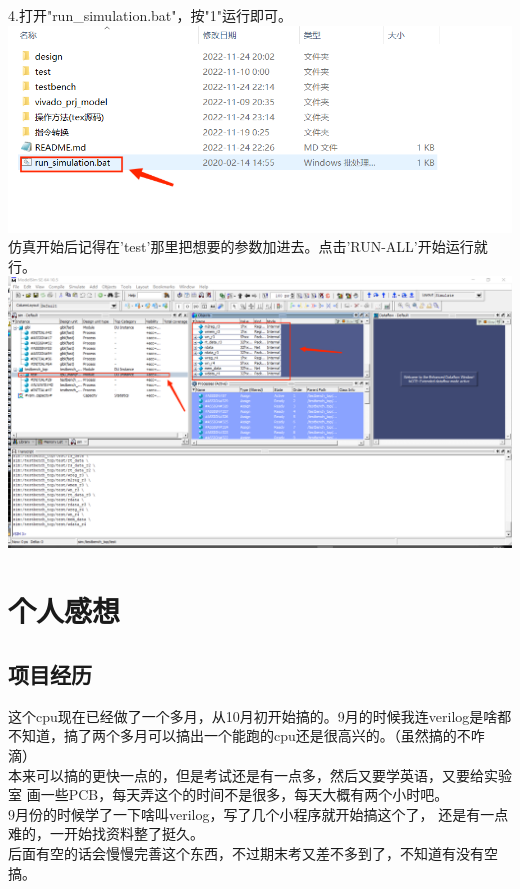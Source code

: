 \documentclass{article}
\newcommand{\tab}{\makebox[2em][l]{}}   %
\begin{document}
\begin{flushleft}
   \tab 4.打开"run\_simulation.bat"，按"1"运行即可。\\
   \mbox{} \hfill{\includegraphics[scale=0.4]{9.png}}\hfill \mbox{}\\
   \tab 仿真开始后记得在'test'那里把想要的参数加进去。点击'RUN-ALL'开始运行就行。\\
   \mbox{} \hfill{\includegraphics[scale=0.2]{10.png}}\hfill \mbox{}\\

   \end{flushleft}


{\centering\section {个人感想}}

\subsection{项目经历}
\begin{flushleft}
\tab 这个cpu现在已经做了一个多月，从10月初开始搞的。9月的时候我连verilog是啥都
不知道，搞了两个多月可以搞出一个能跑的cpu还是很高兴的。（虽然搞的不咋滴）\\
\tab 本来可以搞的更快一点的，但是考试还是有一点多，然后又要学英语，又要给实验室
画一些PCB，每天弄这个的时间不是很多，每天大概有两个小时吧。\\
\tab 9月份的时候学了一下啥叫verilog，写了几个小程序就开始搞这个了，
还是有一点难的，一开始找资料整了挺久。\\
\tab 后面有空的话会慢慢完善这个东西，不过期末考又差不多到了，不知道有没有空搞。
\end{flushleft}



          
\end{document}
